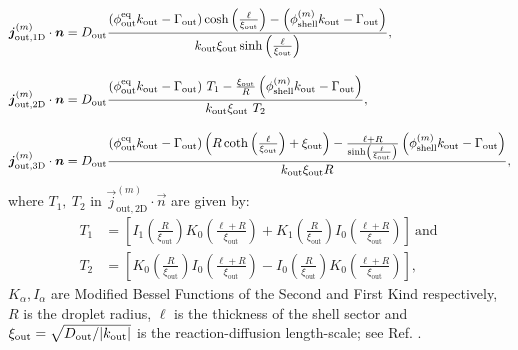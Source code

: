 \begin{appendices}
\begin{subequations}
\label{eqn:FluxesOut_caseA}
\begin{align}
\begin{split}
    \boldsymbol{j}^{(m)}_\mathrm{out, 1D} \cdot \boldsymbol{n}
    &= D_\mathrm{out} \frac{(\phi^\mathrm{eq}_\mathrm{out} k_\mathrm{out} - \Gamma_\mathrm{out}) \cosh \left(\frac{\ell}{\xi_\mathrm{out}}\right) -\left(\phi_\mathrm{shell}^{(m)} k_\mathrm{out}- \Gamma_\mathrm{out} \right) }{k_\mathrm{out} \xi_\mathrm{out} \sinh \left(\frac{\ell}{\xi_\mathrm{out} }\right)},
    \\[10pt]
    \boldsymbol{j}^{(m)}_\mathrm{out, 2D} \cdot \boldsymbol{n}
    &= D_\mathrm{out} \frac{
    (\phi^\mathrm{eq}_\mathrm{out} k_\mathrm{out}-\Gamma_\mathrm{out})~T_1
	- \frac{\xi_\mathrm{out} }{R} \left(\phi_\mathrm{shell}^{(m)} k_\mathrm{out} - \Gamma_\mathrm{out}\right)
    }
    {k_\mathrm{out} \xi_\mathrm{out}~T_2},
    \\[10pt]
    \boldsymbol{j}^{(m)}_\mathrm{out, 3D} \cdot \boldsymbol{n}
    &=  D_\mathrm{out} \frac{(\phi^\mathrm{eq}_\mathrm{out} k_\mathrm{out} - \Gamma_\mathrm{out}) \left(R \coth \left(\frac{\ell}{\xi_\mathrm{out} }\right) + \xi_\mathrm{out} \right)
	- \frac{\ell + R}{\sinh \left(\frac{\ell}{\xi_\mathrm{out} }\right)} \left( \phi_\mathrm{shell}^{(m)} k_\mathrm{out} - \Gamma_\mathrm{out}\right)
	} {k_\mathrm{out} \xi_\mathrm{out} R},
\end{split}
\end{align}
\end{subequations}
where $T_1,~T_2$ in $\vec{j}^{(m)}_\mathrm{out, 2D} \cdot \vec{n}$ are given by:
\begin{subequations}
\begin{align}
    T_1 &= \left[I_1\left(\frac{R}{\xi_\mathrm{out} }\right) K_0\left(\frac{\ell+R}{\xi_\mathrm{out} }\right) + K_1\left(\frac{R}{\xi_\mathrm{out} }\right) I_0\left(\frac{\ell+R}{\xi_\mathrm{out}}\right)\right] \nonumber
    \mathrm{~and~}
    \\[10pt]
    T_2 &= \left[K_0\left(\frac{R}{\xi_\mathrm{out} }\right) I_0\left(\frac{\ell+R}{\xi_\mathrm{out} }\right)-I_0\left(\frac{R}{\xi_\mathrm{out} }\right) K_0\left(\frac{\ell + R}{\xi_\mathrm{out} }\right)\right] \nonumber,
\end{align}
\end{subequations}
$K_\alpha, I_\alpha$ are Modified Bessel Functions of the Second and First Kind respectively, $R$ is the droplet radius, $\ell$ is the thickness of the shell sector and $\xi_\mathrm{out} = \sqrt{D_\mathrm{out}/|k_\mathrm{out}|}$ is the reaction-diffusion length-scale; see Ref. \cite{Review2019}.


\end{appendices}
